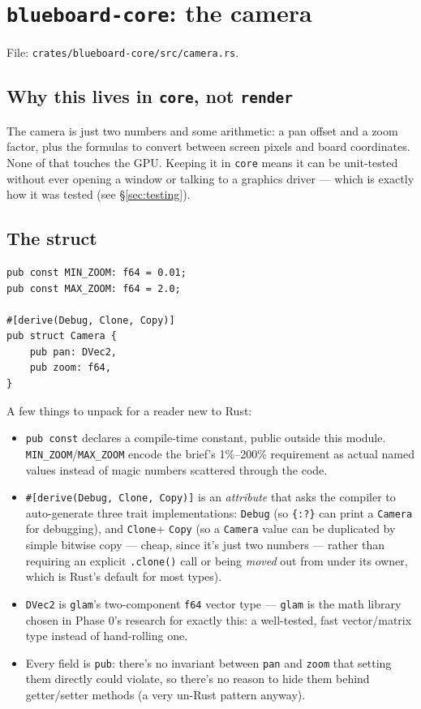 \documentclass[11pt]{article}
\begin{document}
\section{\texttt{blueboard-core}: the camera}

File: \texttt{crates/blueboard-core/src/camera.rs}.

\subsection{Why this lives in \texttt{core}, not \texttt{render}}
The camera is just two numbers and some arithmetic: a pan offset and a zoom factor, plus
the formulas to convert between screen pixels and board coordinates. None of that touches
the GPU. Keeping it in \texttt{core} means it can be unit-tested without ever opening a
window or talking to a graphics driver — which is exactly how it was tested (see
\S\ref{sec:testing}).

\subsection{The struct}
\begin{lstlisting}
pub const MIN_ZOOM: f64 = 0.01;
pub const MAX_ZOOM: f64 = 2.0;

#[derive(Debug, Clone, Copy)]
pub struct Camera {
    pub pan: DVec2,
    pub zoom: f64,
}
\end{lstlisting}
A few things to unpack for a reader new to Rust:
\begin{itemize}
  \item \texttt{pub const} declares a compile-time constant, public outside this module.
    \texttt{MIN\_ZOOM}/\texttt{MAX\_ZOOM} encode the brief's 1\%--200\% requirement as
    actual named values instead of magic numbers scattered through the code.
  \item \texttt{\#[derive(Debug, Clone, Copy)]} is an \emph{attribute} that asks the
    compiler to auto-generate three trait implementations: \texttt{Debug} (so
    \texttt{\{:?\}} can print a \texttt{Camera} for debugging), and \texttt{Clone}+
    \texttt{Copy} (so a \texttt{Camera} value can be duplicated by simple bitwise copy —
    cheap, since it's just two numbers — rather than requiring an explicit
    \texttt{.clone()} call or being \emph{moved} out from under its owner, which is Rust's
    default for most types).
  \item \texttt{DVec2} is \texttt{glam}'s two-component \texttt{f64} vector type —
    \texttt{glam} is the math library chosen in Phase 0's research for exactly this: a
    well-tested, fast vector/matrix type instead of hand-rolling one.
  \item Every field is \texttt{pub}: there's no invariant between \texttt{pan} and
    \texttt{zoom} that setting them directly could violate, so there's no reason to hide
    them behind getter/setter methods (a very un-Rust pattern anyway).
\end{itemize}
\end{document}
